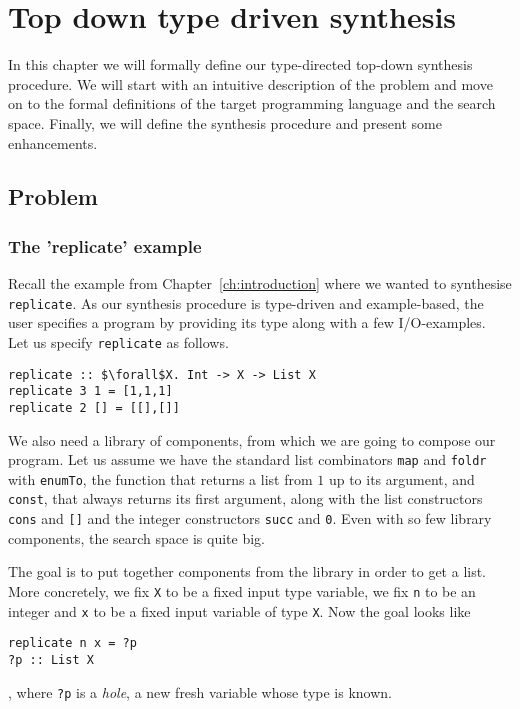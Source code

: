 \lstset{style=plain}

\chapter{Top down type driven synthesis} \label{ch:definitions}

In this chapter we will formally define our type-directed top-down synthesis procedure. We will start with an intuitive description of the problem and move on to the formal definitions of the target programming language and the search space. Finally, we will define the synthesis procedure and present some enhancements.

\section{Problem}

\subsection{The 'replicate' example}

Recall the example from Chapter~\ref{ch:introduction} where we wanted to synthesise \lstinline?replicate?. As our synthesis procedure is type-driven and example-based, the user specifies a program by providing its type along with a few I/O-examples.\\
Let us specify \lstinline?replicate? as follows.
\begin{lstlisting}[style=plain]
replicate :: $\forall$X. Int -> X -> List X
replicate 3 1 = [1,1,1]
replicate 2 [] = [[],[]]
\end{lstlisting}

We also need a library of components, from which we are going to compose our program. Let us assume we have the standard list combinators \lstinline?map? and \lstinline?foldr? with \lstinline?enumTo?, the function that returns a list from $1$ up to its argument, and \lstinline?const?, that always returns its first argument, along with the list constructors \lstinline?cons? and \lstinline?[]? and the integer constructors \lstinline?succ? and \lstinline?0?. Even with so few library components, the search space is quite big.

The goal is to put together components from the library in order to get a list. More concretely, we fix \lstinline?X? to be a fixed input type variable, we fix \lstinline?n? to be an integer and \lstinline?x? to be a fixed input variable of type \lstinline?X?. Now the goal looks like
\begin{lstlisting}[style=plain]
replicate n x = ?p
?p :: List X
\end{lstlisting}, 
where \lstinline!?p! is a \emph{hole}, a new fresh variable whose type is known.

